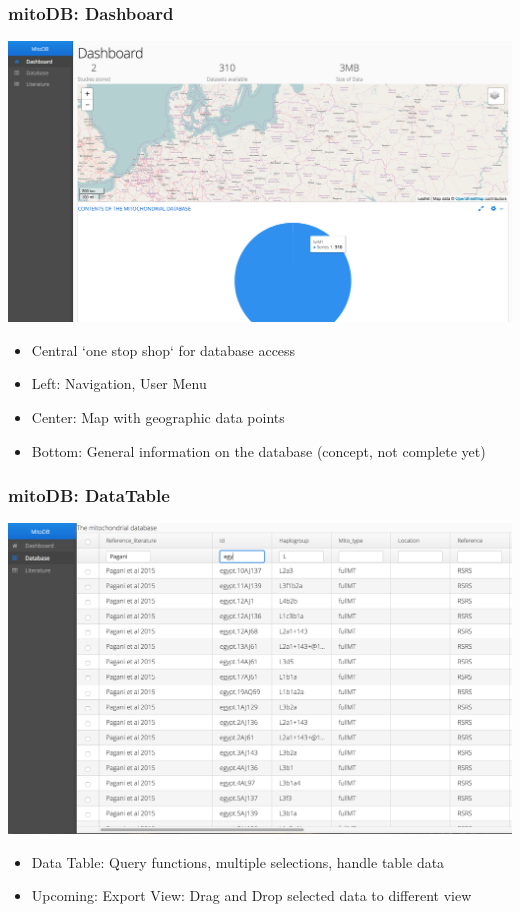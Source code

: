 \documentclass{beamer} %
\begin{document}
\begin{frame}
\frametitle{mitoDB: Dashboard}
\centering
	\includegraphics[scale=0.2]{imagesDB/mitodb_dashboard.png}
\begin{itemize}
\item Central `one stop shop` for database access
\item Left: Navigation, User Menu
\item Center: Map with geographic data points
\item Bottom: General information on the database (concept, not complete yet)
\end{itemize}
\end{frame}

\begin{frame}
\frametitle{mitoDB: DataTable}
\centering	
	\includegraphics[scale=0.2]{imagesDB/mitodb_data.png}
\begin{itemize}
\item Data Table: Query functions, multiple selections, handle table data
\item  \textcolor{alexred}{Upcoming:} Export View: Drag and Drop selected data to different view
\end{itemize}
\end{frame}
\end{document}
